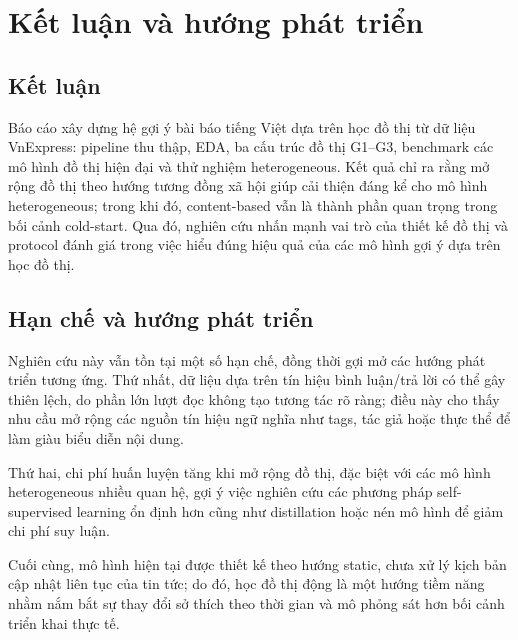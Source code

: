 \documentclass[11pt]{article}
\begin{document}
\section{Kết luận và hướng phát triển}
\label{sec:conclusion}

\subsection{Kết luận}
Báo cáo xây dựng hệ gợi ý bài báo tiếng Việt dựa trên học đồ thị từ dữ liệu VnExpress: pipeline thu thập, EDA, ba cấu trúc đồ thị G1--G3, benchmark các mô hình đồ thị hiện đại và thử nghiệm heterogeneous. Kết quả chỉ ra rằng mở rộng đồ thị theo hướng tương đồng xã hội giúp cải thiện đáng kể cho mô hình heterogeneous; trong khi đó, content-based vẫn là thành phần quan trọng trong bối cảnh cold-start. Qua đó, nghiên cứu nhấn mạnh vai trò của thiết kế đồ thị và protocol đánh giá trong việc hiểu đúng hiệu quả của các mô hình gợi ý dựa trên học đồ thị.

\subsection{Hạn chế và hướng phát triển}
Nghiên cứu này vẫn tồn tại một số hạn chế, đồng thời gợi mở các hướng phát triển tương ứng.
Thứ nhất, dữ liệu dựa trên tín hiệu bình luận/trả lời có thể gây thiên lệch,
do phần lớn lượt đọc không tạo tương tác rõ ràng;
điều này cho thấy nhu cầu mở rộng các nguồn tín hiệu ngữ nghĩa như tags, tác giả hoặc thực thể
để làm giàu biểu diễn nội dung.

Thứ hai, chi phí huấn luyện tăng khi mở rộng đồ thị,
đặc biệt với các mô hình heterogeneous nhiều quan hệ,
gợi ý việc nghiên cứu các phương pháp self-supervised learning ổn định hơn
cũng như distillation hoặc nén mô hình để giảm chi phí suy luận.

Cuối cùng, mô hình hiện tại được thiết kế theo hướng static,
chưa xử lý kịch bản cập nhật liên tục của tin tức;
do đó, học đồ thị động là một hướng tiềm năng
nhằm nắm bắt sự thay đổi sở thích theo thời gian
và mô phỏng sát hơn bối cảnh triển khai thực tế.



\end{document}

